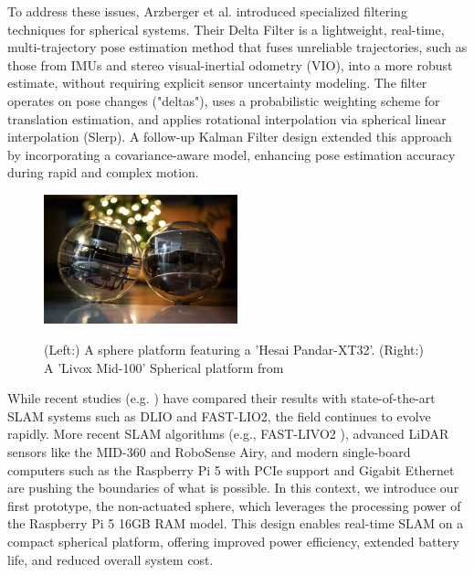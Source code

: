 \documentclass[english, bachelor, utf8]{base/thesis_telematics}
\begin{document}
To address these issues, Arzberger et al. \cite{Kalman_filter_sphere,sphere_Fabi_1,DeltaFilter} introduced specialized filtering techniques for spherical systems. 
Their Delta Filter is a lightweight, real-time, multi-trajectory pose estimation method that fuses unreliable trajectories, such as those from IMUs and stereo visual-inertial odometry (VIO), into a more robust estimate, without requiring explicit sensor uncertainty modeling. 
The filter operates on pose changes ("deltas"), uses a probabilistic weighting scheme for translation estimation, and applies rotational interpolation via spherical linear interpolation (Slerp). 
A follow-up Kalman Filter design extended this approach by incorporating a covariance-aware model, enhancing pose estimation accuracy during rapid and complex motion.

\begin{figure}[h]
    \centering
    \includegraphics[width=0.5\textwidth]{pics/delta_kalman_robots.jpg}
    \label{fig:delta_kalman_robots}
    \caption{(Left:) A sphere platform featuring a 'Hesai Pandar-XT32'\cite{Kalman_filter_sphere}. (Right:) A 'Livox Mid-100' Spherical platform from \cite{DeltaFilter}}
\end{figure}

While recent studies (e.g. \cite{Kalman_filter_sphere}) have compared their results with state-of-the-art SLAM systems such as DLIO\cite{dlio} and FAST-LIO2\cite{fastlio2}, the field continues to evolve rapidly. 
More recent SLAM algorithms (e.g., FAST-LIVO2 \cite{fastlivo2}), advanced LiDAR sensors like the MID-360 and RoboSense Airy, and modern single-board computers such as the Raspberry Pi 5 with PCIe support and Gigabit Ethernet are pushing the boundaries of what is possible. 
In this context, we introduce our first prototype, the non-actuated sphere, which leverages the processing power of the Raspberry Pi 5 16GB RAM model. 
This design enables real-time SLAM on a compact spherical platform, offering improved power efficiency, extended battery life, and reduced overall system cost.
\end{document}
